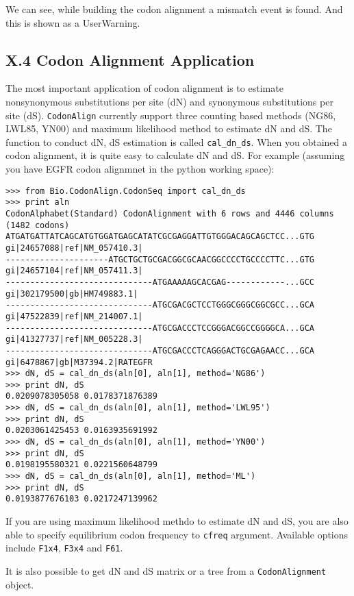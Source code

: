 \documentclass{article}
\begin{document}
We can see, while building the codon alignment a mismatch event is
found. And this is shown as a UserWarning.

\subsection{X.4 Codon Alignment Application}

The most important application of codon alignment is to estimate
nonsynonymous substitutions per site (dN) and synonymous substitutions
per site (dS). \texttt{CodonAlign} currently support three counting
based methods (NG86, LWL85, YN00) and maximum likelihood method to
estimate dN and dS. The function to conduct dN, dS estimation is called
\texttt{cal\_dn\_ds}. When you obtained a codon alignment, it is quite
easy to calculate dN and dS. For example (assuming you have EGFR codon
alignmnet in the python working space):

\begin{verbatim}
>>> from Bio.CodonAlign.CodonSeq import cal_dn_ds
>>> print aln
CodonAlphabet(Standard) CodonAlignment with 6 rows and 4446 columns (1482 codons)
ATGATGATTATCAGCATGTGGATGAGCATATCGCGAGGATTGTGGGACAGCAGCTCC...GTG gi|24657088|ref|NM_057410.3|
---------------------ATGCTGCTGCGACGGCGCAACGGCCCCTGCCCCTTC...GTG gi|24657104|ref|NM_057411.3|
------------------------------ATGAAAAAGCACGAG------------...GCC gi|302179500|gb|HM749883.1|
------------------------------ATGCGACGCTCCTGGGCGGGCGGCGCC...GCA gi|47522839|ref|NM_214007.1|
------------------------------ATGCGACCCTCCGGGACGGCCGGGGCA...GCA gi|41327737|ref|NM_005228.3|
------------------------------ATGCGACCCTCAGGGACTGCGAGAACC...GCA gi|6478867|gb|M37394.2|RATEGFR
>>> dN, dS = cal_dn_ds(aln[0], aln[1], method='NG86')
>>> print dN, dS
0.0209078305058 0.0178371876389
>>> dN, dS = cal_dn_ds(aln[0], aln[1], method='LWL95')
>>> print dN, dS
0.0203061425453 0.0163935691992
>>> dN, dS = cal_dn_ds(aln[0], aln[1], method='YN00')
>>> print dN, dS
0.0198195580321 0.0221560648799
>>> dN, dS = cal_dn_ds(aln[0], aln[1], method='ML')
>>> print dN, dS
0.0193877676103 0.0217247139962
\end{verbatim}

If you are using maximum likelihood methdo to estimate dN and dS, you
are also able to specify equilibrium codon frequency to \texttt{cfreq}
argument. Available options include \texttt{F1x4}, \texttt{F3x4} and
\texttt{F61}.

It is also possible to get dN and dS matrix or a tree from a
\texttt{CodonAlignment} object.
\end{document}
